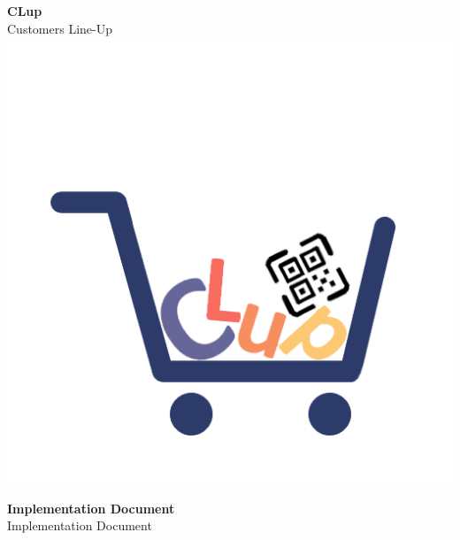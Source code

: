 



\begin{titlepage}
  \begin{center}

    \HUGE \textbf{CLup} \\[0.5cm]
    \LARGE Customers Line-Up \\[0.5cm]
    \hspace*{-1.2cm}\includegraphics[scale=0.5]{../../logo/clup_logo_nobg.png}

    \vfill

    \Huge \textbf{Implementation Document} \\
    \LARGE Implementation Document \\[2cm]


\end{center}
\end{titlepage}
